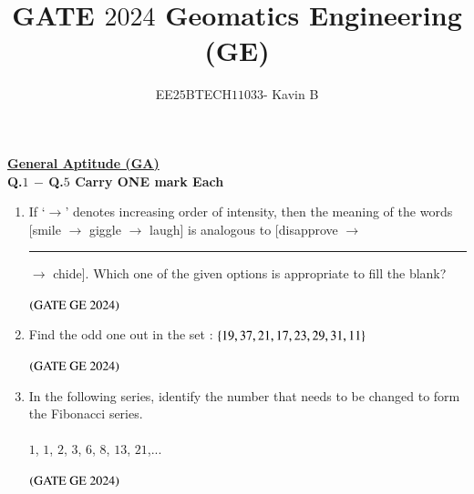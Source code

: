 \documentclass[journal,12pt,onecolumn]{IEEEtran}
\theoremstyle{remark}
\begin{document}
\title{GATE $2024$ Geomatics Engineering (GE)}
\author{EE$25$BTECH$11033$- Kavin B}
\maketitle
\renewcommand{\thefigure}{\theenumi}
\renewcommand{\thetable}{\theenumi}

\underline{\textbf{General Aptitude (GA)}}
\\


\textbf{Q.$1$ $-$ Q.$5$ Carry ONE mark Each}
\vspace{0.5cm}
\begin{enumerate}
\item If `$\rightarrow$' denotes increasing order of intensity, then the meaning of the words [smile $\rightarrow$ giggle $\rightarrow$ laugh] is analogous to [disapprove $\rightarrow$ \rule{2.5cm}{1pt}$\rightarrow$ chide].
Which one of the given options is appropriate to fill the blank?
\begin{enumerate}
\end{enumerate}
\hfill $\brak{\text{GATE GE 2024}}$
\bigskip
\item Find the odd one out in the set : $\cbrak{19,37,21,17, 23, 29, 31, 11}$
\begin{enumerate}
\end{enumerate}
\hfill $\brak{\text{GATE GE 2024}}$
\bigskip
\item In the following series, identify the number that needs to be changed to form the Fibonacci series.\\
\\
$1$, $1$, $2$, $3$, $6$, $8$, $13$, $21$,...
\begin{enumerate}
\end{enumerate}
\hfill $\brak{\text{GATE GE 2024}}$
\bigskip


\end{enumerate}
\end{document}

